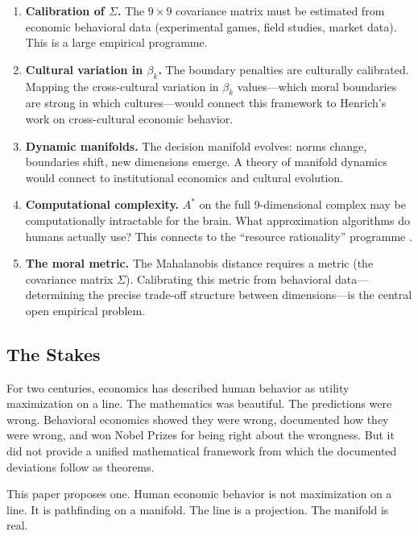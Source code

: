 \documentclass[12pt]{article}
\theoremstyle{definition}
\theoremstyle{remark}
\begin{document}
\begin{enumerate}
    \item \textbf{Calibration of $\Sigma$.}  The $9 \times 9$ covariance matrix must be estimated from economic behavioral data (experimental games, field studies, market data).  This is a large empirical programme.

    \item \textbf{Cultural variation in $\beta_k$.}  The boundary penalties are culturally calibrated.  Mapping the cross-cultural variation in $\beta_k$ values---which moral boundaries are strong in which cultures---would connect this framework to Henrich's \cite{henrich2010} work on cross-cultural economic behavior.

    \item \textbf{Dynamic manifolds.}  The decision manifold evolves: norms change, boundaries shift, new dimensions emerge.  A theory of manifold dynamics would connect to institutional economics and cultural evolution.

    \item \textbf{Computational complexity.}  $A^*$ on the full 9-dimensional complex may be computationally intractable for the brain.  What approximation algorithms do humans actually use?  This connects to the ``resource rationality'' programme \cite{lieder2020}.

    \item \textbf{The moral metric.}  The Mahalanobis distance requires a metric (the covariance matrix $\Sigma$).  Calibrating this metric from behavioral data---determining the precise trade-off structure between dimensions---is the central open empirical problem.
\end{enumerate}

\subsection{The Stakes}

For two centuries, economics has described human behavior as utility maximization on a line.  The mathematics was beautiful.  The predictions were wrong.  Behavioral economics showed they were wrong, documented how they were wrong, and won Nobel Prizes for being right about the wrongness.  But it did not provide a unified mathematical framework from which the documented deviations follow as theorems.

This paper proposes one.  Human economic behavior is not maximization on a line.  It is pathfinding on a manifold.  The line is a projection.  The manifold is real.
\end{document}
